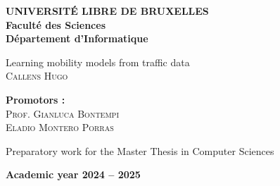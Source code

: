 \thispagestyle{empty}

\begin{center}
\textbf{UNIVERSITÉ LIBRE DE BRUXELLES} \\[0.2cm]
\textbf{Faculté des Sciences} \\[0.2cm]
\textbf{Département d'Informatique}
\end{center}

\vspace{4cm}

\begin{center}
{\Large Learning mobility models from traffic data} \\[0.5cm]
\textsc{Callens Hugo}
\end{center}

\vspace{4cm}

\noindent
\textbf{Promotors :} \\
\textsc{Prof. Gianluca Bontempi} \\ %
\textsc{Eladio Montero Porras} \\[1cm] %

\begin{center}
Preparatory work for the Master Thesis in Computer Sciences
\end{center}

\vfill

\begin{center}
\textbf{Academic year 2024 -- 2025}
\end{center}

\newpage
